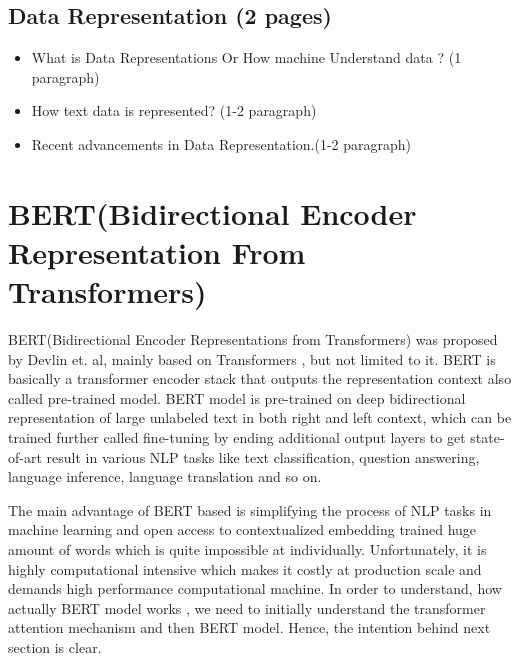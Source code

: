 \documentclass[%
	BCOR=8mm, %
	DIV=12, 
	toc=bibliography, %
	toc=listof, %
	oneside, %
	egregdoesnotlikesansseriftitles, %
	]{scrbook}
\begin{document}
\subsection{Data Representation (2 pages)}
\label{subsection:DataRep}

\begin{itemize}
\item What is Data Representations Or How machine Understand data ? (1 paragraph)
\item How text data is represented? (1-2 paragraph)
\item Recent advancements in Data Representation.(1-2 paragraph)
\end{itemize}
\section{BERT(Bidirectional Encoder Representation From Transformers)}

 BERT(Bidirectional Encoder Representations from Transformers) was proposed by Devlin et$.$ al\cite{devlin_bert_2019}, mainly based on Transformers \cite{vaswani_attention_2017},
 but not limited to it. BERT is  basically a transformer encoder stack that outputs the representation context also called pre-trained model. BERT model is pre-trained on deep bidirectional 
 representation of large unlabeled text in both right and left context, which can be trained further called fine-tuning by ending additional output layers to get state-of-art result in various 
 NLP tasks like text classification, question answering, language inference,  language translation and so on. 
 
 The main advantage of BERT based is simplifying the process of NLP tasks in machine learning and open access to contextualized embedding trained huge amount of words which is 
 quite impossible at individually. Unfortunately, it is highly computational intensive which makes it costly at production scale and demands high performance computational machine.
In order to understand, how actually BERT model works , we need to initially understand the transformer attention mechanism and then BERT model. Hence, the intention behind next 
section is clear.
\end{document}
